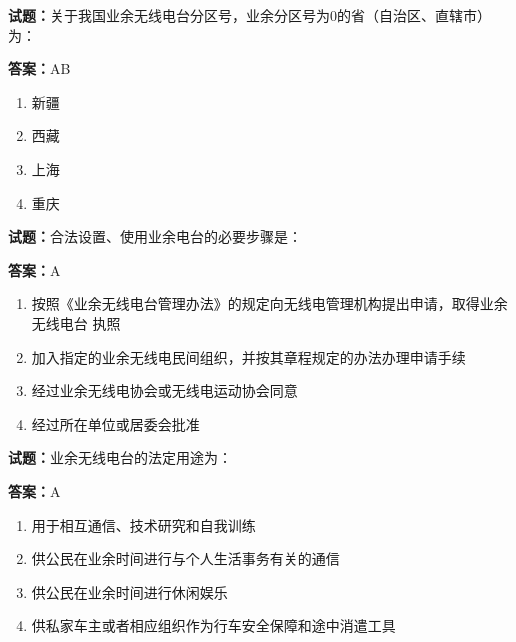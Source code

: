 \documentclass{ctexbook}
\begin{document}




\vspace{1em}

\textbf{试题：}关于我国业余无线电台分区号，业余分区号为0的省（自治区、直辖市）为： 

\textbf{答案：}AB 

\begin{enumerate}[leftmargin=3em]
  \item 新疆 

  \item 西藏 

  \item 上海 

  \item 重庆 

\end{enumerate}





\vspace{1em}

\textbf{试题：}合法设置、使用业余电台的必要步骤是： 

\textbf{答案：}A 

\begin{enumerate}[leftmargin=3em]
  \item 按照《业余无线电台管理办法》的规定向无线电管理机构提出申请，取得业余无线电台
执照 

  \item 加入指定的业余无线电民间组织，并按其章程规定的办法办理申请手续 

  \item 经过业余无线电协会或无线电运动协会同意 

  \item 经过所在单位或居委会批准 

\end{enumerate}





\vspace{1em}

\textbf{试题：}业余无线电台的法定用途为： 

\textbf{答案：}A 

\begin{enumerate}[leftmargin=3em]
  \item 用于相互通信、技术研究和自我训练 

  \item 供公民在业余时间进行与个人生活事务有关的通信 

  \item 供公民在业余时间进行休闲娱乐 

  \item 供私家车主或者相应组织作为行车安全保障和途中消遣工具 

\end{enumerate}
\end{document}
